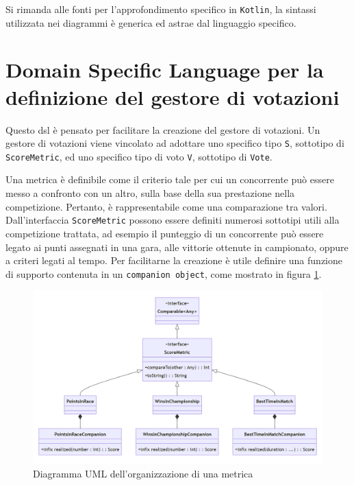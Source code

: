 \documentclass[12pt,a4paper,openright,twoside]{book}
\begin{document}
Si rimanda alle fonti per l'approfondimento specifico in \texttt{Kotlin}, la sintassi utilizzata nei diagrammi
è generica ed astrae dal linguaggio specifico.


\section{Domain Specific Language per la definizione del gestore di votazioni }
Questo \ac{dsl} è pensato per facilitare la creazione del gestore di votazioni.
Un gestore di votazioni viene vincolato ad adottare uno specifico tipo \texttt{S}, sottotipo di \texttt{ScoreMetric}, ed uno specifico
tipo di voto \texttt{V}, sottotipo di \texttt{Vote}.

Una metrica è definibile come il criterio tale per cui un concorrente può essere messo a confronto con un altro, sulla base della
sua prestazione nella competizione. Pertanto, è rappresentabile come una comparazione tra valori.
Dall'interfaccia \texttt{ScoreMetric} possono essere definiti numerosi sottotipi utili alla competizione trattata, ad esempio il punteggio di un concorrente
può essere legato ai punti assegnati in una gara, alle vittorie ottenute in campionato, oppure a criteri legati al tempo.
Per facilitarne la creazione è utile definire una funzione di supporto contenuta in un \texttt{companion object}, come mostrato in figura \ref{fig:metrica}.

\vfill
\begin{center} 
\begin{figure}[H]
    \centering
     \includegraphics[width=1.1\linewidth]{figures/scoremetric.PNG}
     \caption{Diagramma UML dell'organizzazione di una metrica}
    \label{fig:metrica}
 \end{figure}
\end{center}
\vfill
\end{document}
